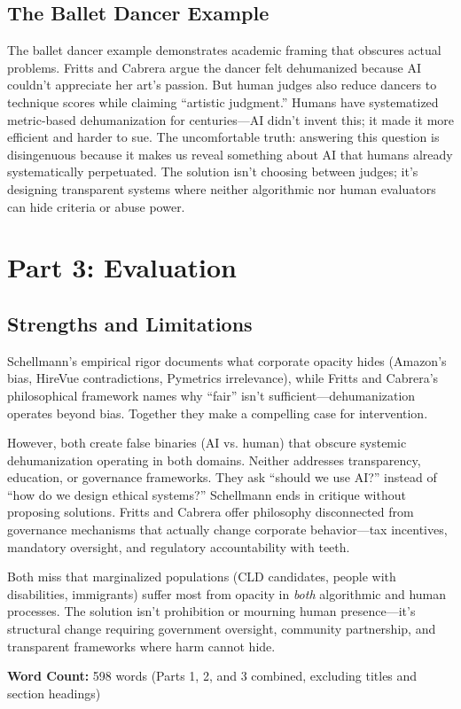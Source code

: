 \documentclass[11pt,twoside]{article}
\begin{document}
\subsection{The Ballet Dancer Example}

The ballet dancer example demonstrates academic framing that obscures actual problems. Fritts and Cabrera argue the dancer felt dehumanized because AI couldn't appreciate her art's passion. But human judges also reduce dancers to technique scores while claiming \enquote{artistic judgment.} Humans have systematized metric-based dehumanization for centuries—AI didn't invent this; it made it more efficient and harder to sue. The uncomfortable truth: answering this question is disingenuous because it makes us reveal something about AI that humans already systematically perpetuated. The solution isn't choosing between judges; it's designing transparent systems where neither algorithmic nor human evaluators can hide criteria or abuse power.

\section{Part 3: Evaluation}

\subsection{Strengths and Limitations}

Schellmann's empirical rigor documents what corporate opacity hides (Amazon's bias, HireVue contradictions, Pymetrics irrelevance), while Fritts and Cabrera's philosophical framework names why \enquote{fair} isn't sufficient—dehumanization operates beyond bias. Together they make a compelling case for intervention.

However, both create false binaries (AI vs. human) that obscure systemic dehumanization operating in both domains. Neither addresses transparency, education, or governance frameworks. They ask \enquote{should we use AI?} instead of \enquote{how do we design ethical systems?} Schellmann ends in critique without proposing solutions. Fritts and Cabrera offer philosophy disconnected from governance mechanisms that actually change corporate behavior—tax incentives, mandatory oversight, and regulatory accountability with teeth.

Both miss that marginalized populations (CLD candidates, people with disabilities, immigrants) suffer most from opacity in \textit{both} algorithmic and human processes. The solution isn't prohibition or mourning human presence—it's structural change requiring government oversight, community partnership, and transparent frameworks where harm cannot hide.

\vfill
\noindent\centering\footnotesize\textbf{Word Count:} 598 words (Parts 1, 2, and 3 combined, excluding titles and section headings)
\end{document}
